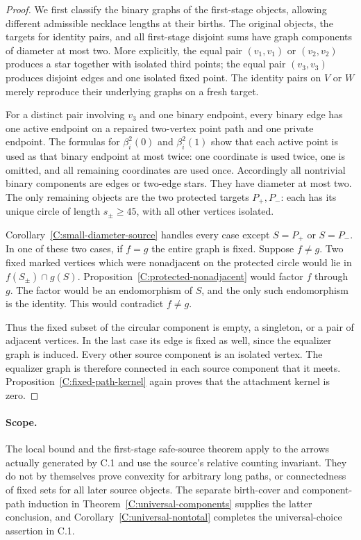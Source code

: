 \begin{proof}
We first classify the binary graphs of the first-stage objects,
allowing different admissible necklace lengths at their births.
The original objects, the targets for identity pairs, and all
first-stage disjoint sums have graph components of diameter at most
two.  More explicitly, the equal pair $(v_1,v_1)$ or $(v_2,v_2)$
produces a star together with isolated third points; the equal pair
$(v_3,v_3)$ produces disjoint edges and one isolated fixed point.
The identity pairs on $V$ or $W$ merely reproduce their underlying
graphs on a fresh target.

For a distinct pair involving $v_3$ and one binary endpoint, every
binary edge has one active endpoint on a repaired two-vertex point
path and one private endpoint.  The formulas for $\beta_i^2(0)$
and $\beta_i^2(1)$ show that each active point is used as that
binary endpoint at most twice: one coordinate is used twice, one
is omitted, and all remaining coordinates are used once.
Accordingly all nontrivial binary components are edges or
two-edge stars.  They have diameter at most two.  The only remaining
objects are the two protected targets $P_+,P_-$: each has its unique
circle of length $s_\pm\geq45$, with all other vertices isolated.

Corollary~\ref{C:small-diameter-source} handles every case except
$S=P_+$ or $S=P_-$.  In one of these two cases, if $f=g$ the entire
graph is fixed.  Suppose $f\ne g$.  Two fixed marked vertices
which were nonadjacent on the protected circle would lie in
$f(S_\pm)\cap g(S)$.  Proposition~\ref{C:protected-nonadjacent}
would factor $f$ through $g$.  The factor would be an endomorphism
of $S$, and the only such endomorphism is the identity.  This
would contradict $f\ne g$.

Thus the fixed subset of the circular component is empty, a
singleton, or a pair of adjacent vertices.  In the last case its
edge is fixed as well, since the equalizer graph is induced.
Every other source component is an isolated vertex.  The
equalizer graph is therefore connected in each source component
that it meets.  Proposition~\ref{C:fixed-path-kernel} again proves
that the attachment kernel is zero.
\end{proof}

\paragraph{Scope.}
The local bound and the first-stage safe-source theorem apply to
the arrows actually generated by C.1 and use the source's relative
counting invariant. They do not by themselves prove convexity for
arbitrary long paths, or connectedness of fixed sets for all later
source objects. The separate birth-cover and component-path
induction in Theorem~\ref{C:universal-components} supplies the
latter conclusion, and Corollary~\ref{C:universal-nontotal}
completes the universal-choice assertion in C.1.

